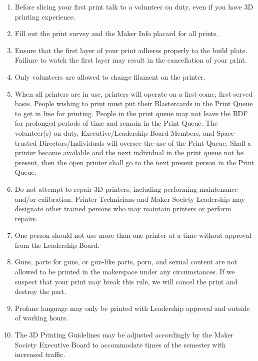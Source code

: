 \documentclass[12pt,letterpaper]{article}
\begin{document}
\begin{enumerate}
    \item Before slicing your first print talk to a volunteer on duty, even if you have 3D printing experience. 
    \item Fill out the print survey and the Maker Info placard for all prints. 
    \item Ensure that the first layer of your print adheres properly to the build plate.
    Failiure to watch the first layer may result in the cancellation of your print.
    \item Only volunteers are allowed to change filament on the printer.

    \item When all printers are in use, printers will operate on a first-come, first-served basis. People wishing to print must put their Blastercards in the Print Queue to get in line for printing. People in the print queue may not leave the BDF for prolonged periods of time and remain in the Print Queue. The volunteer(s) on duty, Executive/Leadership Board Members, and Space-trusted Directors/Individuals will oversee the use of the Print Queue. Shall a printer become available and the next individual in the print queue not be present, then the open printer shall go to the next present person in the Print Queue.
    
    \item Do not attempt to repair 3D printers, including performing maintenance and/or calibration. Printer Technicians and Maker Society Leadership may designate other trained persons who may maintain printers or perform repairs.
    
    \item One person should not use more than one printer at a time without approval from the Leadership Board.
    \item Guns, parts for guns, or gun-like parts, porn, and sexual content are not allowed to be printed in the makerspace under any circumstances. If we suspect that your print may break this rule, we will cancel the print and destroy the part.  
    \item Profane language may only be printed with Leadership approval and outside of working hours. 
    \item The 3D Printing Guidelines may be adjusted accordingly by the Maker Society Executive Board to accommodate times of the semester with increased traffic. 
\end{enumerate}
\end{document}
